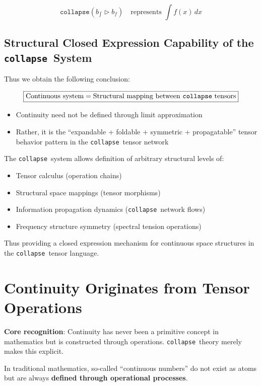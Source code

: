 \documentclass[12pt,a4paper]{article}
\theoremstyle{plain}
\theoremstyle{definition}
\theoremstyle{remark}
\newcommand{\collapse}{\texttt{collapse}}
\begin{document}
\begin{equation}
\boxed{
\collapse(b_{\int} \triangleright b_f)
}
\quad \text{represents } \int f(x)\, dx
\end{equation}

\subsection{Structural Closed Expression Capability of the \collapse\ System}

Thus we obtain the following conclusion:

\begin{equation}
\boxed{
\text{Continuous system} = \text{Structural mapping between \collapse\ tensors}
}
\end{equation}

\begin{itemize}
\item Continuity need not be defined through limit approximation
\item Rather, it is the ``expandable + foldable + symmetric + propagatable'' tensor behavior pattern in the \collapse\ tensor network
\end{itemize}

The \collapse\ system allows definition of arbitrary structural levels of:
\begin{itemize}
\item Tensor calculus (operation chains)
\item Structural space mappings (tensor morphisms)
\item Information propagation dynamics (\collapse\ network flows)
\item Frequency structure symmetry (spectral tension operations)
\end{itemize}

Thus providing a closed expression mechanism for continuous space structures in the \collapse\ tensor language.

\section{Continuity Originates from Tensor Operations}

\textbf{Core recognition}: Continuity has never been a primitive concept in mathematics but is constructed through operations. \collapse\ theory merely makes this explicit.

In traditional mathematics, so-called ``continuous numbers'' do not exist as atoms but are always \textbf{defined through operational processes}.
\end{document}

